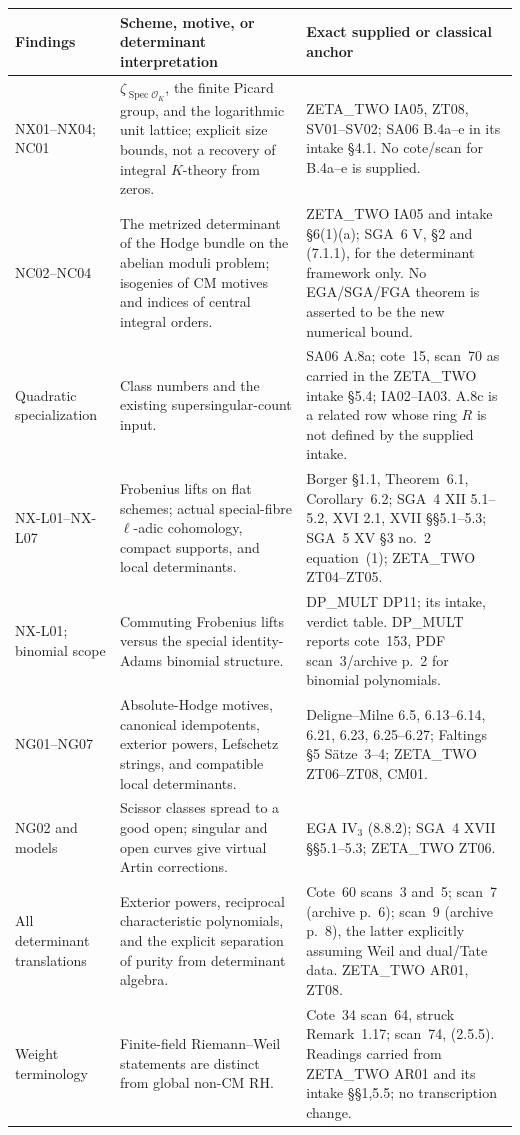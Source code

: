 \documentclass[11pt]{article}
\theoremstyle{remark}
\begin{document}
\small
\begin{longtable}{p{}p{}p{}}
\toprule
Findings & Scheme, motive, or determinant interpretation & Exact supplied or classical anchor\\
\midrule
\endhead
NX01--NX04; NC01 &
$\zeta_{\operatorname{Spec}\mathcal O_K}$, the finite Picard group,
and the logarithmic unit lattice; explicit size bounds, not a recovery
of integral $K$-theory from zeros. &
ZETA\_TWO IA05, ZT08, SV01--SV02; SA06 B.4a--e in its intake
\S4.1. No cote/scan for B.4a--e is supplied.\\[3pt]
NC02--NC04 &
The metrized determinant of the Hodge bundle on the abelian moduli
problem; isogenies of CM motives and indices of central integral
orders. &
ZETA\_TWO IA05 and intake \S6(1)(a);
SGA~6 V, \S2 and (7.1.1), for the determinant framework only.
No EGA/SGA/FGA theorem is asserted to be the new numerical bound.\\[3pt]
Quadratic specialization &
Class numbers and the existing supersingular-count input. &
SA06 A.8a; cote~15, scan~70 as carried in the ZETA\_TWO intake
\S5.4; IA02--IA03. A.8c is a related row whose ring $R$ is not
defined by the supplied intake.\\[3pt]
NX-L01--NX-L07 &
Frobenius lifts on flat schemes; actual special-fibre
$\ell$-adic cohomology, compact supports, and local determinants. &
Borger \S1.1, Theorem~6.1, Corollary~6.2;
SGA~4 XII 5.1--5.2, XVI 2.1, XVII \S\S5.1--5.3;
SGA~5 XV \S3 no.~2 equation~(1);
ZETA\_TWO ZT04--ZT05.\\[3pt]
NX-L01; binomial scope &
Commuting Frobenius lifts versus the special identity-Adams
binomial structure. &
DP\_MULT DP11; its intake, verdict table.
DP\_MULT reports cote~153, PDF scan~3/archive p.~2
for binomial polynomials.\\[3pt]
NG01--NG07 &
Absolute-Hodge motives, canonical idempotents, exterior powers,
Lefschetz strings, and compatible local determinants. &
Deligne--Milne 6.5, 6.13--6.14, 6.21, 6.23, 6.25--6.27;
Faltings \S5 S\"atze~3--4; ZETA\_TWO ZT06--ZT08, CM01.\\[3pt]
NG02 and models &
Scissor classes spread to a good open; singular and open curves
give virtual Artin corrections. &
EGA IV$_3$ (8.8.2); SGA~4 XVII \S\S5.1--5.3;
ZETA\_TWO ZT06.\\[3pt]
All determinant translations &
Exterior powers, reciprocal characteristic polynomials, and the
explicit separation of purity from determinant algebra. &
Cote~60 scans~3 and~5; scan~7 (archive p.~6);
scan~9 (archive p.~8), the latter explicitly assuming Weil
and dual/Tate data. ZETA\_TWO AR01, ZT08.\\[3pt]
Weight terminology &
Finite-field Riemann--Weil statements are distinct from global
non-CM RH. &
Cote~34 scan~64, struck Remark~1.17;
scan~74, (2.5.5). Readings carried from ZETA\_TWO AR01
and its intake \S\S1,5.5; no transcription change.\\
\bottomrule
\end{longtable}
\normalsize
\end{document}

